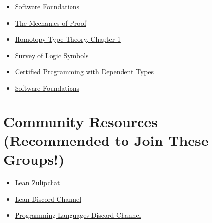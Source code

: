 \documentclass{book}
\providecommand{\tightlist}{%
  \setlength{\itemsep}{0pt}\setlength{\parskip}{0pt}}
\begin{document}
\begin{itemize}
\tightlist
\item
  \href{https://softwarefoundations.cis.upenn.edu/}{Software Foundations}
\item
  \href{https://hrmacbeth.github.io/math2001/}{The Mechanics of Proof}
\item
  \href{https://hott.github.io/book/hott-online-15-ge428abf.pdf}{Homotopy Type Theory, Chapter 1}
\item
  \href{https://mathvault.ca/hub/higher-math/math-symbols/logic-symbols/}{Survey of Logic Symbols}
\item
  \href{http://adam.chlipala.net/cpdt/}{Certified Programming with Dependent Types}
\item
  \href{https://softwarefoundations.cis.upenn.edu/}{Software Foundations}
\end{itemize}

\hypertarget{book__pandoc__debug__src__resources.md__community-resources-recommended-to-join-these-groups}{%
\section*{Community Resources (Recommended to Join These Groups!)}\label{book__pandoc__debug__src__resources.md__community-resources-recommended-to-join-these-groups}}

\begin{itemize}
\tightlist
\item
  \href{https://leanprover.zulipchat.com/}{Lean Zulipchat}
\item
  \href{https://discord.gg/WZ9bs9UCvx}{Lean Discord Channel}
\item
  \href{https://discord.gg/Up7KFNnF}{Programming Languages Discord Channel}
\end{itemize}
\end{document}

